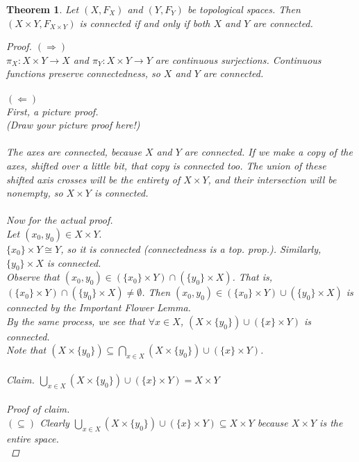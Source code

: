 \documentclass[10pt,reqno]{amsart}
\newtheorem*{Important Flower Lemma}{Important Flower Lemma}
\newtheorem*{Theorem}{Theorem}
\newtheorem*{Teeny Facts About Connected Components}{Teeny Facts About Connected Components}
\begin{document}
\begin{Theorem}
Let $(X, F_X)$ and $(Y, F_Y)$ be topological spaces. Then $(X\times Y, F_{X\times Y})$ is connected if and only if both $X$ and $Y$ are connected.
\begin{proof}
$(\Rightarrow)$\\
$\pi_X: X\times Y \longrightarrow X$ and $\pi_Y: X\times Y \longrightarrow Y$ are continuous surjections. Continuous functions preserve connectedness, so $X$ and $Y$ are connected. \\
\vspace{.8in}\\
$(\Leftarrow)$\\
First, a picture proof.\\
(Draw your picture proof here!)\\
\vspace{2.2in}\\
The axes are connected, because $X$ and $Y$ are connected. If we make a copy of the axes, shifted over a little bit, that copy is connected too. The union of these shifted axis crosses will be the entirety of $X\times Y$, and their intersection will be nonempty, so $X\times Y$ is connected.\\\\
Now for the actual proof.\\
Let $(x_0, y_0) \in X\times Y.$\\
$\{x_0\}\times Y \cong Y$, so it is connected (connectedness is a top. prop.). Similarly, $\{y_0\} \times X$ is connected.\\
Observe that $(x_0, y_0) \in (\{x_0\}\times Y) \cap (\{y_0\} \times X)$.  That is, $(\{x_0\}\times Y) \cap (\{y_0\} \times X) \neq \emptyset$.
Then $(x_0, y_0) \in (\{x_0\}\times Y) \cup (\{y_0\} \times X)$ is connected by the Important Flower Lemma.\\
By the same process, we see that $\forall x\in X$, $(X\times \{y_0\}) \cup (\{x\} \times Y)$ is connected.\\
Note that $(X\times \{y_0\}) \subseteq \displaystyle{\bigcap_{x \in X}(X\times \{y_0\}) \cup (\{x\} \times Y)}$.\\\\
{\it Claim.}  $\displaystyle{\bigcup_{x \in X}(X\times \{y_0\}) \cup (\{x\} \times Y)} = X\times Y$\\\\
{\it Proof of claim.}\\
$(\subseteq)$ Clearly $\displaystyle{\bigcup_{x \in X}(X\times \{y_0\}) \cup (\{x\} \times Y)} \subseteq X\times Y$ because $X\times Y$ is the entire space. \\

\end{proof}
\end{Theorem}
\end{document}
